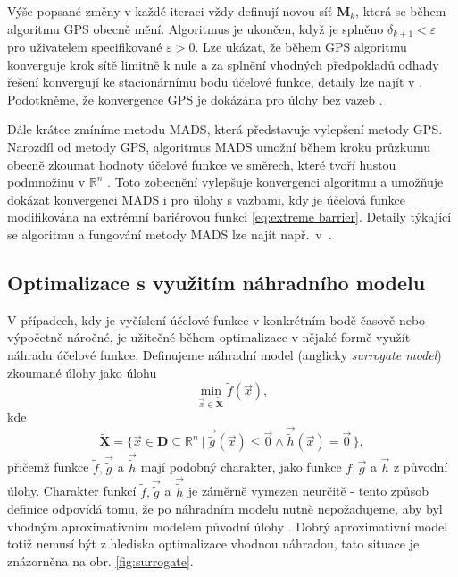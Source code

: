 Výše popsané změny v každé iteraci vždy definují novou síť $ \mathbf{M} _k$, která se během algoritmu GPS obecně mění. Algoritmus je ukončen, když je splněno $ \delta_{k+1} < \varepsilon $ pro uživatelem specifikované $ \varepsilon > 0 $. Lze ukázat, že během GPS algoritmu konverguje krok sítě limitně k nule a za splnění vhodných předpokladů odhady řešení konvergují ke stacionárnímu bodu účelové funkce, detaily lze najít v \cite{BBO-textbook}. Podotkněme, že konvergence GPS je dokázána pro úlohy bez vazeb \cite{BBO-textbook}.

Dále krátce zmíníme metodu MADS, která představuje vylepšení metody GPS. Narozdíl od metody GPS, algoritmus MADS umožní během kroku průzkumu obecně zkoumat hodnoty účelové funkce ve směrech, které tvoří hustou podmnožinu v $ \mathbb{R}^{n} $ \cite{BBO-textbook, derivative-free-review}. Toto zobecnění vylepšuje konvergenci algoritmu a umožňuje dokázat konvergenci MADS i pro úlohy s vazbami, kdy je účelová funkce modifikována na extrémní bariérovou funkci \ref{eq:extreme barrier}. Detaily týkající se algoritmu a fungování metody MADS lze najít např.~v~\cite{BBO-textbook}.

\subsection{Optimalizace s využitím náhradního modelu}\label{model-based}
V případech, kdy je vyčíslení účelové funkce v konkrétním bodě časově nebo výpočetně  náročné, je užitečné během optimalizace v nějaké formě využít náhradu účelové funkce. Definujeme náhradní model (anglicky \textit{surrogate model}) zkoumané úlohy jako úlohu
\begin{equation}
	\min_{\vec{x} \in \mathbf{\tilde{X}}} \tilde{f}(\vec{x}),
\end{equation}
kde
\begin{equation}
\mathbf{\tilde{X}} = \big\{ \vec{x} \in \mathbf{D} \subseteq \mathbb{R}^n \ | \ \vec{\tilde{g}} (\vec{x}) \leq \vec{0} \wedge \vec{\tilde{h}} (\vec{x}) = \vec{0} \, \big\},
\end{equation}
přičemž funkce $ \tilde{f}, \vec{\tilde{g}}$ a $ \vec{\tilde{h}} $ mají podobný charakter, jako funkce $ f, \vec{g} $ a $ \vec{h}$ z původní úlohy. Charakter funkcí $ \tilde{f}, \vec{\tilde{g}}$ a $ \vec{\tilde{h}} $ je záměrně vymezen neurčitě - tento způsob definice odpovídá tomu, že po náhradním modelu nutně nepožadujeme, aby byl vhodným aproximativním modelem původní úlohy \cite{two-decades, BBO-textbook, Kramer2011}. Dobrý aproximativní model totiž nemusí být z hlediska optimalizace vhodnou náhradou, tato situace je znázorněna na obr. \ref{fig:surrogate}.

